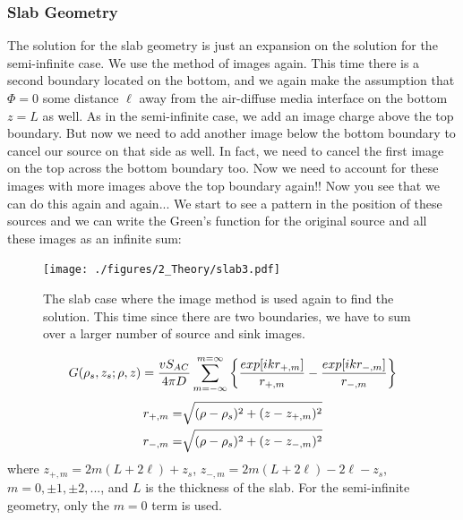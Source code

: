 \subsubsection{Slab Geometry}
The solution for the slab geometry is just an expansion on the solution for the semi-infinite case. We use the method of images again. This time there is a second boundary located on the bottom, and we again make the assumption that $\Phi=0$ some distance $\ell$ away from the air-diffuse media interface on the bottom $z=L$ as well. As in the semi-infinite case, we add an image charge above the top boundary. But now we need to add another image below the bottom boundary to cancel our source on that side as well. In fact, we need to cancel the first image on the top across the bottom boundary too.
Now we need to account for these images with more images above the top boundary again!! Now you see that we can do this again and again... We start to see a pattern in the position of these sources and we can write the Green's function for the original source and all these images as an infinite sum:
\begin{figure}[h]
\begin{center}
\texttt{[image: ./figures/2\_Theory/slab3.pdf]}
\caption{The slab case where the image method is used again to find  the solution. This time since there are two boundaries, we have to sum over a larger number of source and sink images.}
\label{slab}
\end{center}
\end{figure}
\begin{equation}
G(\rho_s,z_s;\rho,z) = \frac{vS_{AC}}{4\pi D} \sum_{m=-\infty}^{m=\infty} 
\left\{ \frac{exp[ikr_{+,m}]}{r_{+,m}} - \frac{exp[ikr_{-,m}]}{r_{-,m}} \right\} \notag
\end{equation}
\begin{eqnarray}
\label{ext_both}
r_{+,m} = & \sqrt{(\rho-\rho_s)^2+(z-z_{+,m})^2} \notag \\
r_{-,m} = & \sqrt{(\rho-\rho_s)^2+(z-z_{-,m})^2}
\end{eqnarray}
\noindent
where $z_{+,m}=2m(L+2\ell)+z_s$, $z_{-,m}=2m(L+2\ell)-2\ell-z_s$, $m=0,\pm 1, \pm 2, ...$, and $L$ is the thickness of the slab. For the semi-infinite geometry, only the $m=0$ term is used. 

